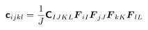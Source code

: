 \documentclass[10pt,letterpaper,oneside]{report}
\newcommand{\ten}[1]{\mbox{\boldmath $#1$}{}}
\newcommand{\tenf}[1]{\mbox{{\sffamily{\bfseries {#1}}}}}
\begin{document}
\begin{align}
\tenf{c}_{ijkl} ={}& \frac{1}{J} \tenf{C}_{IJKL} \ten{F}_{iI} \ten{F}_{jJ} \ten{F}_{kK} \ten{F}_{lL}  
\\

\end{align}
\end{document}
